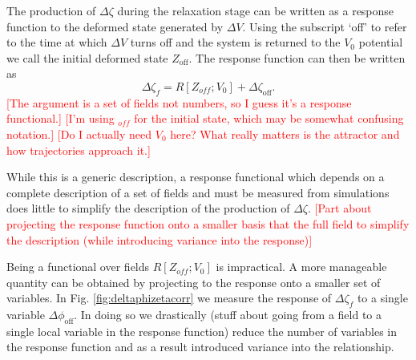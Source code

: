 The production of $\Delta\zeta$ during the relaxation stage can be written as a response function to the deformed state generated by $\Delta V$. Using the subscript `off' to refer to the time at which $\Delta V$ turns off and the system is returned to the $V_0$ potential we call the initial deformed state $Z_\mathrm{off}$. The response function can then be written as 
\begin{equation}
  \Delta\zeta_f = R[Z_{off};V_0] + \Delta\zeta_\mathrm{off}.
\end{equation}
\textcolor{red}{[The argument is a set of fields not numbers, so I guess it's a response functional.]}
\textcolor{red}{[I'm using ${}_{off}$ for the initial state, which may be somewhat confusing notation.]}
\textcolor{red}{[Do I actually need $V_0$ here? What really matters is the attractor and how trajectories approach it.]}



While this is a generic description, a response functional which depends on a complete description of a set of fields and must be measured from simulations does little to simplify the description of the production of $\Delta\zeta$.
\textcolor{red}{[Part about projecting the response function onto a smaller basis that the full field to simplify the description (while introducing variance into the response)]}

Being a functional over fields $R[Z_{off};V_0]$ is impractical. A more manageable quantity can be obtained by projecting to the response onto a smaller set of variables. In Fig. \ref{fig:deltaphizetacorr} we measure the response of $\Delta\zeta_f$ to a single variable $\Delta\phi_\mathrm{off}$. In doing so we drastically
(stuff about going from a field to a single local variable in the response function)
reduce the number of variables in the response function and as a result introduced variance into the relationship.



